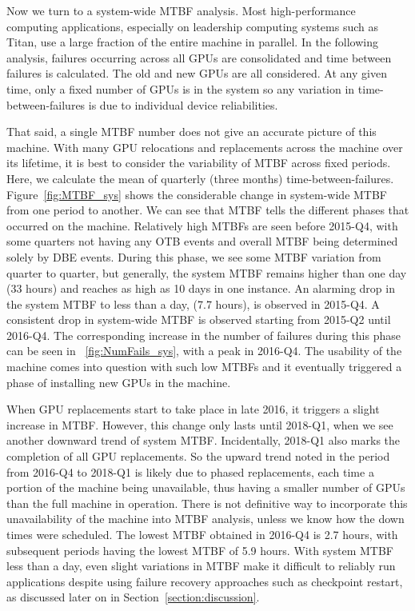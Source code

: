 Now we turn to a system-wide MTBF analysis. Most high-performance
computing applications, especially on leadership computing
systems such as Titan, use a large fraction of the entire machine in parallel.  
In the following analysis, failures occurring across all GPUs are consolidated and time between failures
is calculated. The old and new GPUs are all considered. At any given time, only a fixed number of GPUs
is in the system so any variation in time-between-failures is due to individual device reliabilities.

That said, a single MTBF number does not give an accurate picture of this machine.
With many GPU relocations and replacements across the machine over its lifetime, it is 
best to consider the variability of MTBF across fixed periods. Here, we calculate 
the mean of quarterly (three months) time-between-failures. Figure~\ref{fig:MTBF_sys}
shows the considerable change in system-wide MTBF from one period to another. 
We can see that MTBF tells the different phases that occurred on the machine. 
Relatively high MTBFs are seen before 2015-Q4, with some quarters not having any OTB events 
and overall MTBF being determined solely by DBE events. During this
phase, we see some MTBF variation from quarter to quarter, but
generally, the system MTBF remains higher than one day (33 hours) and reaches as high
as 10 days in one instance. An alarming drop in the system MTBF to less than a day, (7.7 hours), is observed in 2015-Q4.
A consistent drop in system-wide MTBF is observed starting from 2015-Q2 until 2016-Q4. 
The corresponding increase in the number of failures during this phase can be seen in ~\ref{fig:NumFails_sys},
with a peak in 2016-Q4. The usability of the machine comes into
question with such low MTBFs and it eventually triggered 
a phase of installing new GPUs in the machine.

When GPU replacements start to take place in late 
2016, it triggers a slight increase in MTBF. However, this change only lasts until 2018-Q1, when we see another 
downward trend of system MTBF. Incidentally, 2018-Q1 also marks the completion of all GPU replacements. 
So the upward trend noted in the period from 2016-Q4 to 2018-Q1 is
likely due to phased replacements, each time a portion of the machine 
being unavailable, thus having a smaller number of GPUs than the full
machine in operation. 
There is not definitive way to incorporate this unavailability of the
machine into MTBF analysis, unless we know how the down times were scheduled.
The lowest MTBF obtained in 2016-Q4 is 2.7 hours, with subsequent periods having the 
lowest MTBF of 5.9 hours. With system MTBF less than a day, even slight variations in MTBF make it 
difficult to reliably run applications despite using failure recovery approaches such as checkpoint restart, 
as discussed later on in Section~\ref{section:discussion}. 

